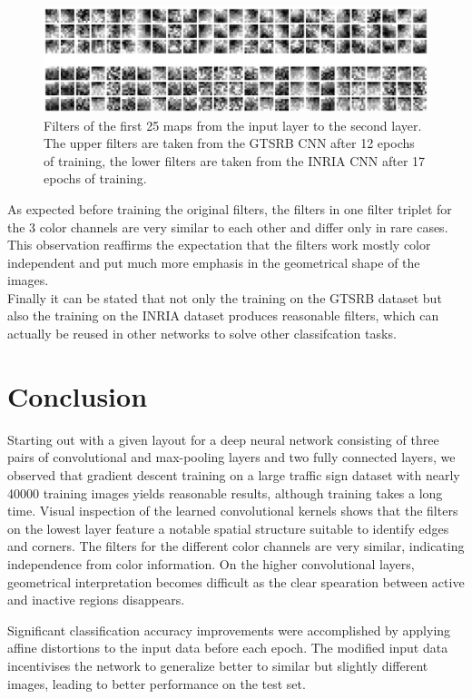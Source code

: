 \documentclass[11pt, a4paper]{article}
\begin{document}
\begin{figure}[h!]
	\centering
	\includegraphics[width=1\textwidth]{gtsrb_vs_inria_filters.png}
	\caption{Filters of the first 25 maps from the input layer to the second layer. The upper filters are taken from the GTSRB CNN after 12 epochs of training, the lower filters are taken from the INRIA CNN after 17 epochs of training.}
	\label{fig:gtsrb_vs_inria_filters}
\end{figure}

As expected before training the original filters, the filters in one filter triplet for the 3 color channels are very similar to each other and differ only in rare cases. This observation reaffirms the expectation that the filters work mostly color independent and put much more emphasis in the geometrical shape of the images.\\
Finally it can be stated that not only the training on the GTSRB dataset but also the training on the INRIA dataset produces reasonable filters, which can actually be reused in other networks to solve other classifcation tasks.


\section{Conclusion}
Starting out with a given layout for a deep neural network consisting of three pairs of convolutional and max-pooling layers and two fully connected layers, we observed that gradient descent training on a large traffic sign dataset with nearly 40000 training images yields reasonable results, although training takes a long time. Visual inspection of the learned convolutional kernels shows that the filters on the lowest layer feature a notable spatial structure suitable to identify edges and corners. The filters for the different color channels are very similar, indicating independence from color information. On the higher convolutional layers, geometrical interpretation becomes difficult as the clear spearation between active and inactive regions disappears.

Significant classification accuracy improvements were accomplished by applying affine distortions to the input data before each epoch. The modified input data incentivises the network to generalize better to similar but slightly different images, leading to better performance on the test set.
\end{document}
